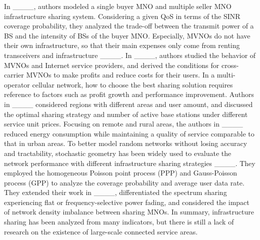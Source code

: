 In ____, authors modeled a single buyer MNO and multiple seller MNO infrastructure sharing system. Considering a given QoS in terms of the SINR coverage probability, they analyzed the trade-off between the transmit power of a BS and the intensity of BSs of the buyer MNO. Especially, MVNOs do not have their own infrastructure, so that their main expenses only come from renting transceivers and infrastructure ____. In ____, authors studied the behavior of MVNOs and Internet service providers, and derived the conditions for cross-carrier MVNOs to make profits and reduce costs for their users.
In a multi-operator cellular network, how to choose the best sharing solution requires reference to factors such as profit growth and performance improvement. Authors in ____ considered regions with different areas and user amount, and discussed the optimal sharing strategy and number of active base stations under different service unit prices. Focusing on remote and rural areas, the authors in ____ reduced energy consumption while maintaining a quality of service comparable to that in urban areas. To better model random networks without losing accuracy and tractability, stochastic geometry has been widely used to evaluate the network performance with different infrastructure sharing strategies ____.
They employed the homogeneous Poisson point process (PPP) and Gauss-Poisson process (GPP) to analyze the coverage probability and average user data rate. They extended their work in ____, differentiated the spectrum sharing experiencing flat or frequency-selective power fading, and considered the impact of network density imbalance between sharing MNOs. In summary, infrastructure sharing has been analyzed from many indicators, but there is still a lack of research on the existence of large-scale connected service areas.

